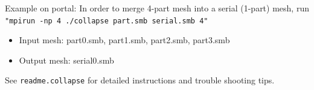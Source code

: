 Example on portal:
\newline
In order to merge 4-part mesh into a serial (1-part) mesh, run
\texttt{"mpirun -np 4 ./collapse part.smb serial.smb 4"}
\begin{itemize}
\item	Input mesh: part0.smb, part1.smb, part2.smb, part3.smb
\item	Output mesh: serial0.smb
\end{itemize}

See \texttt{readme.collapse} for detailed instructions and trouble shooting tips.
